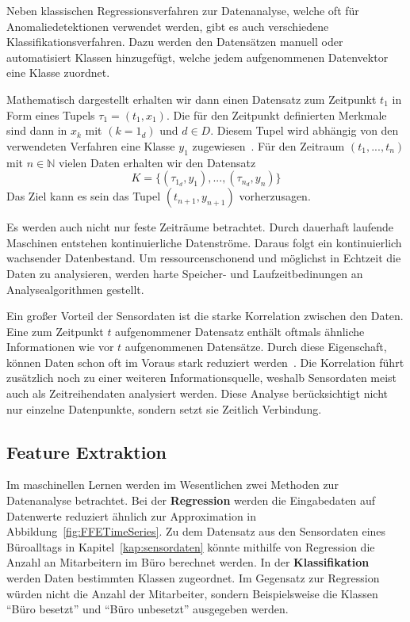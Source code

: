 Neben klassischen Regressionsverfahren zur Datenanalyse, welche oft für Anomaliedetektionen verwendet werden, gibt es auch verschiedene Klassifikationsverfahren. Dazu werden den Datensätzen manuell oder automatisiert Klassen hinzugefügt, welche jedem aufgenommenen Datenvektor eine Klasse zuordnet.

Mathematisch dargestellt erhalten wir dann einen Datensatz zum Zeitpunkt $t_1$ in Form eines Tupels $\tau_1=(t_1,x_1)$. Die für den Zeitpunkt definierten Merkmale sind dann in $x_k$ mit $(k=1_d)$ und $d \in D$. Diesem Tupel wird abhängig von den verwendeten Verfahren eine Klasse $y_1$ zugewiesen~\cite{gay2013feature}. Für den Zeitraum $(t_1,...,t_n)$ mit $n \in \mathbb{N}$ vielen Daten erhalten wir den Datensatz 
\begin{equation}
  K=\{ (\tau_{1_d},y_{1}), ... , (\tau_{n_d},y_n) \}
  \label{equ:trainingset}
\end{equation}
Das Ziel kann es sein das Tupel $(t_{n+1},y_{n+1})$ vorherzusagen.

Es werden auch nicht nur feste Zeiträume betrachtet. 
Durch dauerhaft laufende Maschinen entstehen kontinuierliche Datenströme.
Daraus folgt ein kontinuierlich wachsender Datenbestand.
Um ressourcenschonend und möglichst in Echtzeit die Daten zu analysieren, werden harte Speicher- und Laufzeitbedinungen an Analysealgorithmen gestellt.

Ein großer Vorteil der Sensordaten ist die starke Korrelation zwischen den Daten. Eine zum Zeitpunkt $t$ aufgenommener Datensatz enthält oftmals ähnliche Informationen wie vor $t$ aufgenommenen Datensätze. Durch diese Eigenschaft, können Daten schon oft im Voraus stark reduziert werden~\cite{morchen2003time}.
Die Korrelation führt zusätzlich noch zu einer weiteren Informationsquelle, weshalb Sensordaten meist auch als Zeitreihendaten analysiert werden.
Diese Analyse berücksichtigt nicht nur einzelne Datenpunkte, sondern setzt sie Zeitlich Verbindung.



\subsection{Feature Extraktion}\label{kap:featureextraktionuebersicht}
Im maschinellen Lernen werden im Wesentlichen zwei Methoden zur Datenanalyse betrachtet. Bei der \textbf{Regression} werden die Eingabedaten auf Datenwerte reduziert ähnlich zur Approximation in Abbildung\ \ref{fig:FFETimeSeries}. Zu dem Datensatz aus den Sensordaten eines Büroalltags in Kapitel\ \ref{kap:sensordaten} könnte mithilfe von Regression die Anzahl an Mitarbeitern im Büro berechnet werden. In der \textbf{Klassifikation} werden Daten bestimmten Klassen zugeordnet. Im Gegensatz zur Regression würden nicht die Anzahl der Mitarbeiter, sondern Beispielsweise die Klassen \enquote{Büro besetzt} und \enquote{Büro unbesetzt} ausgegeben werden.

